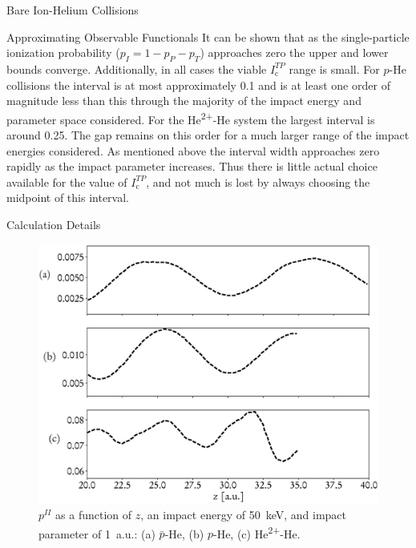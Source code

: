 \documentclass[letterpaper, 11 pt]{report}
\begin{document}
\begin{chapter}{Bare Ion-Helium Collisions \label{chap:p-he2p-he}}
\begin{section}{Approximating Observable Functionals \label{sec:phe2p-obs}}
      It can be shown that as the single-particle ionization probability ($p_I = 1 - p_P - p_T$)
      approaches zero the upper and lower bounds converge. Additionally, in all cases the viable
      $I_\mathrm{c}^{TP}$ range is small. For $p$-He collisions the interval is at most approximately
      0.1 and is at least one order of magnitude less than this through the majority of the impact
      energy and parameter space considered. For the He\textsuperscript{2+}-He system the largest
      interval is around 0.25. The gap remains on this order for a much larger range of the impact
      energies considered. As mentioned above the interval width approaches zero rapidly as the impact
      parameter increases. Thus there is little actual choice available for the value of
      $I_\mathrm{c}^{TP}$, and not much is lost by always choosing the midpoint of this interval.

   \end{section}

   \begin{section}{Calculation Details \label{sec:phe2p-det}}

      \begin{figure}[t]
         \begin{minipage}{.49\linewidth}

            \centering
            \includegraphics[width = \linewidth]{./images/poz.eps}
            \caption[Probabilities as a function of nuclear separation.]{$p^{II}$ as a
                     function of $z$, an impact energy of 50~keV, and impact parameter of 1~a.u.:
                     (a) $\bar{p}$-He, (b) $p$-He, (c) He\textsuperscript{2+}-He. \label{fig:poz}}
         \end{minipage} \hspace{0.009\linewidth} %
         \begin{minipage}{.49\linewidth}


\end{minipage}
\end{figure}
\end{section}
\end{chapter}
\end{document}
